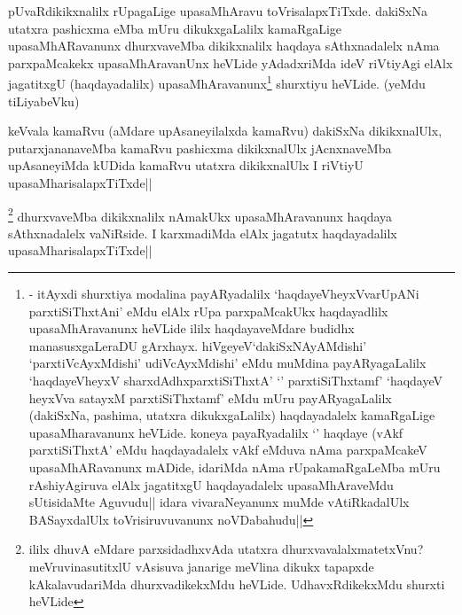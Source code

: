 \begin{artha}
pUvaRdikikxnalilx rUpagaLige upasaMhAravu toVrisalapxTiTxde. dakiSxNa utatxra pashicxma eMba mUru dikukxgaLalilx kamaRgaLige upasaMhARavanunx dhurxvaveMba dikikxnalilx haqdaya sAthxnadalelx nAma parxpaMcakekx upasaMhAravanUnx heVLide yAdadxriMda ideV riVtiyAgi elAlx jagatitxgU (haqdayadalilx) upasaMhAravanunx\footnote[1]{\stext - itAyxdi shurxtiya modalina payARyadalilx `haqdayeVheyxVvarUpANi parxtiSiThxtAni' eMdu elAlx rUpa parxpaMcakUkx haqdayadlilx upasaMhAravanunx heVLide ililx haqdayaveMdare budidhx manasusxgaLeraDU gArxhayx. hiVgeyeV`dakiSxNAyAMdishi' `parxtiVcAyxMdishi' udiVcAyxMdishi' eMdu muMdina payARyagaLalilx `haqdayeVheyxV sharxdAdhxparxtiSiThxtA' `\stext ' parxtiSiThxtamf' `haqdayeV heyxVva satayxM parxtiSiThxtamf' eMdu mUru payARyagaLalilx (dakiSxNa, pashima, utatxra dikukxgaLalilx) haqdayadalelx kamaRgaLige upasaMharavanunx heVLide. koneya payaRyadalilx `\stext ' haqdaye (vAkf parxtiSiThxtA' eMdu haqdayadalelx vAkf eMduva nAma parxpaMcakeV upasaMhARavanunx mADide, idariMda nAma rUpakamaRgaLeMba mUru rAshiyAgiruva elAlx jagatitxgU haqdayadalelx upasaMhAraveMdu sUtisidaMte Aguvudu|| idara vivaraNeyanunx muMde vAtiRkadalUlx BASayxdalUlx toVrisiruvuvanunx noVDabahudu||} shurxtiyu heVLide. (yeMdu tiLiyabeVku)
\end{artha}


\begin{artha}
keVvala kamaRvu (aMdare upAsaneyilalxda kamaRvu) dakiSxNa dikikxnalUlx, putarxjananaveMba kamaRvu pashicxma dikikxnalUlx jAcnxnaveMba upAsaneyiMda kUDida kamaRvu utatxra dikikxnalUlx I riVtiyU upasaMharisalapxTiTxde||
\end{artha}

\begin{artha}
\footnote[1]{ililx dhuvA eMdare parxsidadhxvAda utatxra dhurxvavalalxmatetxVnu? meVruvinasutitxlU vAsisuva janarige meVlina dikukx tapapxde kAkalavudariMda dhurxvadikekxMdu heVLide. UdhavxRdikekxMdu shurxti heVLide} dhurxvaveMba dikikxnalilx nAmakUkx upasaMhAravanunx haqdaya sAthxnadalelx vaNiRside. I karxmadiMda elAlx jagatutx haqdayadalilx upasaMharisalapxTiTxde||
\end{artha}


